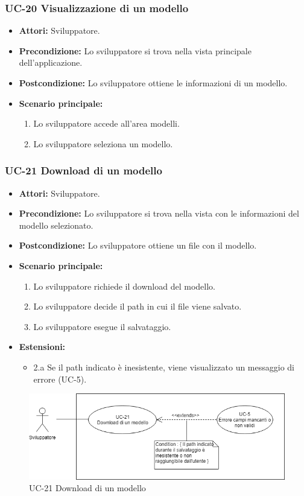 		
	\subsubsection{UC-20 Visualizzazione di un modello}
		\begin{itemize}
			\item \textbf{Attori:} Sviluppatore.
			\item \textbf{Precondizione:} Lo sviluppatore si trova nella vista principale dell'applicazione.
			\item \textbf{Postcondizione:} Lo sviluppatore ottiene le informazioni di un modello.
			\item \textbf{Scenario principale:}
			\begin{enumerate}
				\item Lo sviluppatore accede all'area modelli.
				\item Lo sviluppatore seleziona un modello.
			\end{enumerate}
	\end{itemize}
	
	\subsubsection{UC-21 Download di un modello}
			\begin{itemize}
			\item \textbf{Attori:} Sviluppatore.
			\item \textbf{Precondizione:} Lo sviluppatore si trova nella vista con le informazioni del modello selezionato.
			\item \textbf{Postcondizione:} Lo sviluppatore ottiene un file con il modello.
			\item \textbf{Scenario principale:}
			\begin{enumerate}
					\item Lo sviluppatore richiede il download del modello.
					\item Lo sviluppatore decide il path in cui il file viene salvato.
					\item Lo sviluppatore esegue il salvataggio.
				\end{enumerate}
			\item \textbf{Estensioni:}
				\begin{itemize}
					\item 2.a Se il path indicato è inesistente, viene visualizzato un messaggio di errore (UC-5).
				\end{itemize}
		\end{itemize}
\begin{figure}[h]
			\centering
			\includegraphics[scale=0.7]{images/UC-21.png}
			\caption{UC-21 Download di un modello}
		\end{figure}		
		
